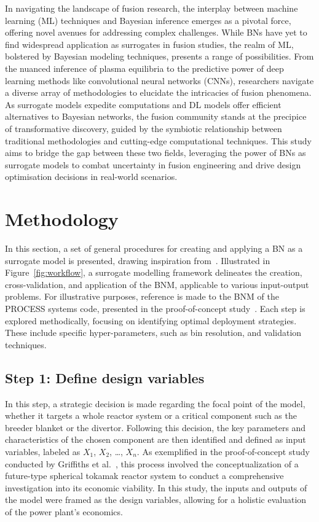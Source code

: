 \documentclass[journal]{IEEEtran}
\begin{document}
In navigating the landscape of fusion research, the interplay between machine learning (ML) techniques and Bayesian inference emerges as a pivotal force, offering novel avenues for addressing complex challenges. While BNs have yet to find widespread application as surrogates in fusion studies, the realm of ML, bolstered by Bayesian modeling techniques, presents a range of possibilities. From the nuanced inference of plasma equilibria to the predictive power of deep learning methods like convolutional neural networks (CNNs), researchers navigate a diverse array of methodologies to elucidate the intricacies of fusion phenomena. As surrogate models expedite computations and DL models offer efficient alternatives to Bayesian networks, the fusion community stands at the precipice of transformative discovery, guided by the symbiotic relationship between traditional methodologies and cutting-edge computational techniques. This study aims to bridge the gap between these two fields, leveraging the power of BNs as surrogate models to combat uncertainty in fusion engineering and drive design optimisation decisions in real-world scenarios.

\section{Methodology}\label{sec:methodology}

In this section, a set of general procedures for creating and applying a BN as a surrogate model is presented, drawing inspiration from~\cite{Conti2019}. Illustrated in Figure~\ref{fig:workflow}, a surrogate modelling framework delineates the creation, cross-validation, and application of the BNM, applicable to various input-output problems. For illustrative purposes, reference is made to the BNM of the PROCESS systems code, presented in the proof-of-concept study~\cite{Griffiths2024}. Each step is explored methodically, focusing on identifying optimal deployment strategies. These include specific hyper-parameters, such as bin resolution, and validation techniques. 

\subsection{\textbf{Step 1}: Define design variables}\label{sec:design}

In this step, a strategic decision is made regarding the focal point of the model, whether it targets a whole reactor system or a critical component such as the breeder blanket or the divertor. Following this decision, the key parameters and characteristics of the chosen component are then identified and defined as input variables, labeled as $X_1$, $X_2$, \ldots, $X_n$. As exemplified in the proof-of-concept study conducted by Griffiths et al.~\cite{Griffiths2024}, this process involved the conceptualization of a future-type spherical tokamak reactor system to conduct a comprehensive investigation into its economic viability. In this study, the inputs and outputs of the model were framed as the design variables, allowing for a holistic evaluation of the power plant's economics.
\end{document}
